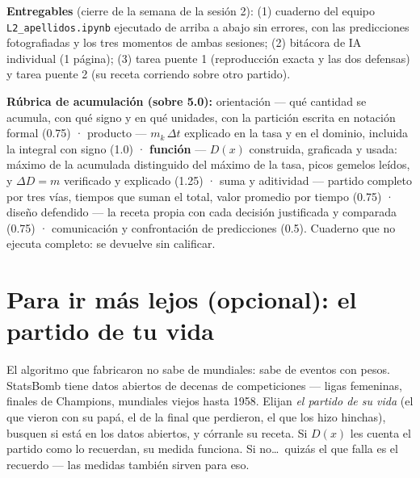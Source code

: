 \documentclass[12pt,letterpaper]{article}
\begin{document}
\begin{cajaentrega}
\textbf{Entregables} (cierre de la semana de la sesión 2): (1) cuaderno del equipo \texttt{L2\_apellidos.ipynb} ejecutado de arriba a abajo sin errores, con las predicciones fotografiadas y los tres momentos de ambas sesiones; (2) bitácora de IA individual (1 página); (3) tarea puente 1 (reproducción exacta y las dos defensas) y tarea puente 2 (su receta corriendo sobre otro partido).

\textbf{Rúbrica de acumulación (sobre 5.0):} orientación --- qué cantidad se acumula, con qué signo y en qué unidades, con la partición escrita en notación formal (0.75) · producto --- $m_k\,\Delta t$ explicado en la tasa y en el dominio, incluida la integral con signo (1.0) · \textbf{función} --- $D(x)$ construida, graficada y usada: máximo de la acumulada distinguido del máximo de la tasa, picos gemelos leídos, y $\Delta D = m$ verificado y explicado (1.25) · suma y aditividad --- partido completo por tres vías, tiempos que suman el total, valor promedio por tiempo (0.75) · diseño defendido --- la receta propia con cada decisión justificada y comparada (0.75) · comunicación y confrontación de predicciones (0.5). Cuaderno que no ejecuta completo: se devuelve sin calificar.
\end{cajaentrega}

\section{Para ir más lejos (opcional): el partido de tu vida}
El algoritmo que fabricaron no sabe de mundiales: sabe de eventos con pesos. StatsBomb tiene datos abiertos de decenas de competiciones --- ligas femeninas, finales de Champions, mundiales viejos hasta 1958. Elijan \emph{el partido de su vida} (el que vieron con su papá, el de la final que perdieron, el que los hizo hinchas), busquen si está en los datos abiertos, y córranle su receta. Si $D(x)$ les cuenta el partido como lo recuerdan, su medida funciona. Si no\ldots\ quizás el que falla es el recuerdo --- las medidas también sirven para eso.
\end{document}
